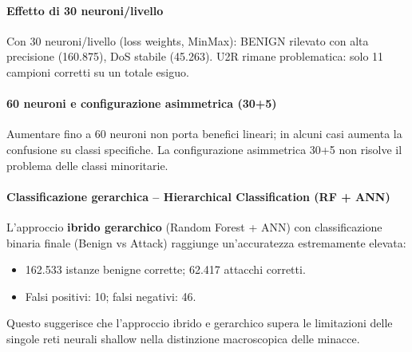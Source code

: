 \paragraph{Effetto di 30 neuroni/livello}
Con 30 neuroni/livello (loss weights, MinMax): BENIGN rilevato con alta
precisione (160.875), DoS stabile (45.263). U2R rimane problematica:
solo 11 campioni corretti su un totale esiguo.

\paragraph{60 neuroni e configurazione asimmetrica (30+5)}
Aumentare fino a 60 neuroni non porta benefici lineari; in alcuni casi
aumenta la confusione su classi specifiche. La configurazione
asimmetrica 30+5 non risolve il problema delle classi minoritarie.

\paragraph{Classificazione gerarchica -- Hierarchical Classification (RF + ANN)}
L'approccio \textbf{ibrido gerarchico} (Random Forest + ANN) con
classificazione binaria finale (Benign vs Attack) raggiunge
un'accuratezza estremamente elevata:
\begin{itemize}
    \item 162.533 istanze benigne corrette; 62.417 attacchi corretti.
    \item Falsi positivi: 10; falsi negativi: 46.
\end{itemize}
Questo suggerisce che l'approccio ibrido e gerarchico supera le
limitazioni delle singole reti neurali shallow nella distinzione
macroscopica delle minacce.
